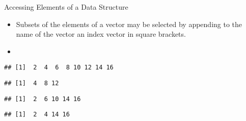 \begin{frame}[fragile]{Accessing Elements of a Data Structure}
\protect\hypertarget{accessing-elements-of-a-data-structure}{}

\begin{itemize}
\item
  Subsets of the elements of a vector may be selected by appending to
  the name of the vector an index vector in square brackets.
\item
\end{itemize}

\begin{Shaded}
\begin{Highlighting}[]
\StringTok{ }\NormalTok{(}\NormalTok{, }\NormalTok{, } \NormalTok{)}
\end{Highlighting}
\end{Shaded}

\begin{verbatim}
## [1]  2  4  6  8 10 12 14 16
\end{verbatim}

\begin{Shaded}
\begin{Highlighting}[]
\NormalTok{    a[}\NormalTok{(}\NormalTok{, }\NormalTok{, }\NormalTok{)] }
\end{Highlighting}
\end{Shaded}

\begin{verbatim}
## [1]  4  8 12
\end{verbatim}

\begin{Shaded}
\begin{Highlighting}[]
\NormalTok{    a[}\OperatorTok{-}\NormalTok{(}\NormalTok{, }\NormalTok{, }\NormalTok{)] }
\end{Highlighting}
\end{Shaded}

\begin{verbatim}
## [1]  2  6 10 14 16
\end{verbatim}

\begin{Shaded}
\begin{Highlighting}[]
\NormalTok{    a[}\OperatorTok{-}\NormalTok{(}\OperatorTok{:}\NormalTok{)] }
\end{Highlighting}
\end{Shaded}

\begin{verbatim}
## [1]  2  4 14 16
\end{verbatim}

\end{frame}

